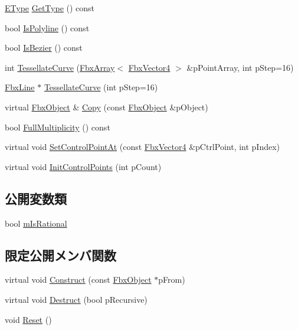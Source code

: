 \begin{DoxyCompactItemize}
\item 
\hyperlink{class_fbx_nurbs_curve_a9f232f09798b106dcc2fd5e2d8c117ed}{E\+Type} \hyperlink{class_fbx_nurbs_curve_a9dd3a14a0bc0aa298b58eb1b42ecd834}{Get\+Type} () const
\item 
bool \hyperlink{class_fbx_nurbs_curve_a197e8df6c4d4e4773c485c0aec5ce593}{Is\+Polyline} () const
\item 
bool \hyperlink{class_fbx_nurbs_curve_a7ccb15bbffaf02d3141ae86d10cf633d}{Is\+Bezier} () const
\item 
int \hyperlink{class_fbx_nurbs_curve_a5e31ed3aff19c0fb28dd18492d044fe8}{Tessellate\+Curve} (\hyperlink{class_fbx_array}{Fbx\+Array}$<$ \hyperlink{class_fbx_vector4}{Fbx\+Vector4} $>$ \&p\+Point\+Array, int p\+Step=16)
\item 
\hyperlink{class_fbx_line}{Fbx\+Line} $\ast$ \hyperlink{class_fbx_nurbs_curve_a535cb7925acf214dee68598777067fd7}{Tessellate\+Curve} (int p\+Step=16)
\item 
virtual \hyperlink{class_fbx_object}{Fbx\+Object} \& \hyperlink{class_fbx_nurbs_curve_ad48046242c0a63d929b5440563668f79}{Copy} (const \hyperlink{class_fbx_object}{Fbx\+Object} \&p\+Object)
\item 
bool \hyperlink{class_fbx_nurbs_curve_ac7a9cb28093611aecedf032a73e76969}{Full\+Multiplicity} () const
\item 
virtual void \hyperlink{class_fbx_nurbs_curve_a7313bcfe1a7b6d566f30e5395bf89877}{Set\+Control\+Point\+At} (const \hyperlink{class_fbx_vector4}{Fbx\+Vector4} \&p\+Ctrl\+Point, int p\+Index)
\item 
virtual void \hyperlink{class_fbx_nurbs_curve_ae6a6921bd7bbe88bcda86f14e9639df0}{Init\+Control\+Points} (int p\+Count)
\end{DoxyCompactItemize}
\subsection*{公開変数類}
\begin{DoxyCompactItemize}
\item 
bool \hyperlink{class_fbx_nurbs_curve_ac8f0d2eb033d7cc5f8bb906ff67f82bc}{m\+Is\+Rational}
\end{DoxyCompactItemize}
\subsection*{限定公開メンバ関数}
\begin{DoxyCompactItemize}
\item 
virtual void \hyperlink{class_fbx_nurbs_curve_ac730e9ec1d56724f8495725b0491ddd8}{Construct} (const \hyperlink{class_fbx_object}{Fbx\+Object} $\ast$p\+From)
\item 
virtual void \hyperlink{class_fbx_nurbs_curve_a8c562cccf434c37cb3aad0df27d60e86}{Destruct} (bool p\+Recursive)
\item 
void \hyperlink{class_fbx_nurbs_curve_ab65486c99f52b9c319583f43f14226bb}{Reset} ()
\end{DoxyCompactItemize}
